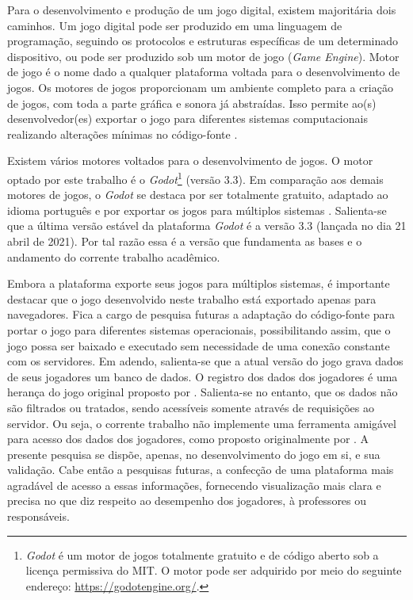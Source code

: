 Para o desenvolvimento e produção de um jogo digital, existem majoritária dois caminhos. Um jogo digital pode ser produzido em uma linguagem de programação, seguindo os protocolos e estruturas específicas de um determinado dispositivo, ou pode ser produzido sob um motor de jogo (\textit{Game Engine}). Motor de jogo é o nome dado a qualquer plataforma voltada para o desenvolvimento de jogos. Os motores de jogos proporcionam um ambiente completo para a criação de jogos, com toda a parte gráfica e sonora já abstraídas. Isso permite ao(s) desenvolvedor(es) exportar o jogo para diferentes sistemas computacionais realizando alterações mínimas no código-fonte \cite{bishop1998designing, machado2009serious}.

Existem vários motores voltados para o desenvolvimento de jogos. O motor optado por este trabalho é o \textit{Godot}\footnote{\textit{Godot} é um motor de jogos totalmente gratuito e de código aberto sob a licença permissiva do MIT. O motor pode ser adquirido por meio do seguinte endereço: \url{https://godotengine.org/}.} (versão 3.3). Em comparação aos demais motores de jogos, o \textit{Godot} se destaca por ser totalmente gratuito, adaptado ao idioma português e por exportar os jogos para múltiplos sistemas \cite{scherer2020analise}. Salienta-se que a última versão estável da plataforma \textit{Godot} é a versão 3.3 (lançada no dia 21 abril de 2021). Por tal razão essa é a versão que fundamenta as bases e o andamento do corrente trabalho acadêmico. 

Embora a plataforma exporte seus jogos para múltiplos sistemas, é importante destacar que o jogo desenvolvido neste trabalho está exportado apenas para navegadores. Fica a cargo de pesquisa futuras a adaptação do código-fonte para portar o jogo para diferentes sistemas operacionais, possibilitando assim, que o jogo possa ser baixado e executado sem necessidade de uma conexão constante com os servidores. Em adendo, salienta-se que a atual versão do jogo grava dados de seus jogadores um banco de dados. O registro dos dados dos jogadores é uma herança do jogo original proposto por . Salienta-se no entanto, que os dados não são filtrados ou tratados, sendo acessíveis somente através de requisições ao servidor. Ou seja, o corrente trabalho não implemente uma ferramenta amigável para acesso dos dados dos jogadores, como proposto originalmente por . A presente pesquisa se dispõe, apenas, no desenvolvimento do jogo em si, e sua validação. Cabe então a pesquisas futuras, a confecção de uma plataforma mais agradável de acesso a essas informações, fornecendo visualização mais clara e precisa no que diz respeito ao desempenho dos jogadores, à professores ou responsáveis. 


